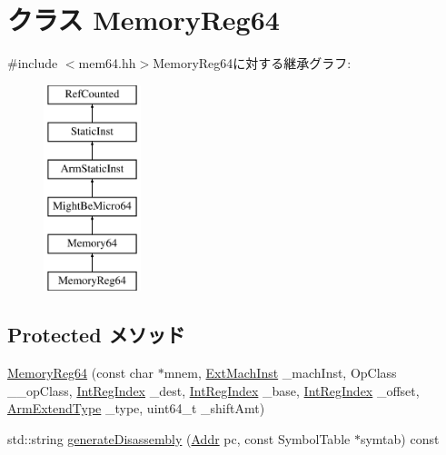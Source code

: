 \hypertarget{classArmISA_1_1MemoryReg64}{
\section{クラス MemoryReg64}
\label{classArmISA_1_1MemoryReg64}
}


{\ttfamily \#include $<$mem64.hh$>$}MemoryReg64に対する継承グラフ:\begin{figure}[H]
\begin{center}
\leavevmode
\includegraphics[height=6cm]{classArmISA_1_1MemoryReg64}
\end{center}
\end{figure}
\subsection*{Protected メソッド}
\begin{DoxyCompactItemize}
\item 
\hyperlink{classArmISA_1_1MemoryReg64_ac98757c3b56f35c1aea7c040106a8afd}{MemoryReg64} (const char $\ast$mnem, \hyperlink{classStaticInst_a5605d4fc727eae9e595325c90c0ec108}{ExtMachInst} \_\-machInst, OpClass \_\-\_\-opClass, \hyperlink{namespaceArmISA_ae64680ba9fb526106829d6bf92fc791b}{IntRegIndex} \_\-dest, \hyperlink{namespaceArmISA_ae64680ba9fb526106829d6bf92fc791b}{IntRegIndex} \_\-base, \hyperlink{namespaceArmISA_ae64680ba9fb526106829d6bf92fc791b}{IntRegIndex} \_\-offset, \hyperlink{namespaceArmISA_a4420842b5673543552a3aba317c69dbb}{ArmExtendType} \_\-type, uint64\_\-t \_\-shiftAmt)
\item 
std::string \hyperlink{classArmISA_1_1MemoryReg64_a95d323a22a5f07e14d6b4c9385a91896}{generateDisassembly} (\hyperlink{classm5_1_1params_1_1Addr}{Addr} pc, const SymbolTable $\ast$symtab) const 
\end{DoxyCompactItemize}
